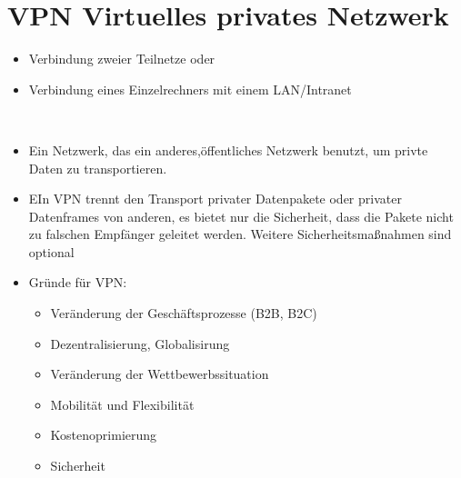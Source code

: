 \section*{VPN Virtuelles privates Netzwerk}
\cite[S. 372-378]{zisler2018computer}
\begin{itemize}
  \item Verbindung zweier Teilnetze oder
  \item Verbindung eines Einzelrechners mit einem LAN/Intranet
\end{itemize}
\\

\cite{lipp2007vpn}
\begin{itemize}
  \item Ein Netzwerk, das ein anderes,öffentliches Netzwerk benutzt, um privte Daten zu transportieren. 
  \item EIn VPN trennt den Transport privater Datenpakete oder privater Datenframes von anderen, es bietet nur die Sicherheit, dass die Pakete nicht zu falschen Empfänger geleitet werden. Weitere Sicherheitsmaßnahmen sind optional
  \item Gründe für VPN: \begin{itemize}
  						\item Veränderung der Geschäftsprozesse (B2B, B2C)
  						\item Dezentralisierung, Globalisirung
  						\item Veränderung der Wettbewerbssituation
  						\item Mobilität und Flexibilität
  						\item Kostenoprimierung
  						\item Sicherheit
						\end{itemize}
						

\end{itemize}
